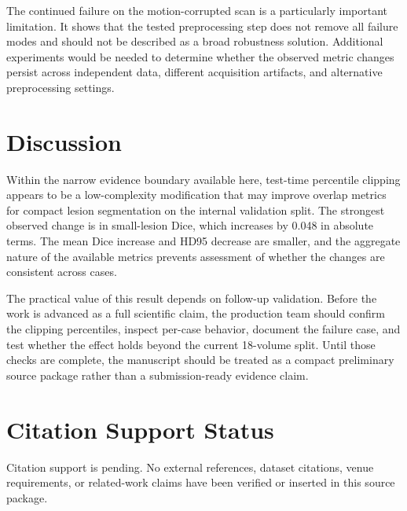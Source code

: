 \documentclass[11pt]{article}
\begin{document}
The continued failure on the motion-corrupted scan is a particularly important limitation. It shows that the tested preprocessing step does not remove all failure modes and should not be described as a broad robustness solution. Additional experiments would be needed to determine whether the observed metric changes persist across independent data, different acquisition artifacts, and alternative preprocessing settings.

\section{Discussion}

Within the narrow evidence boundary available here, test-time percentile clipping appears to be a low-complexity modification that may improve overlap metrics for compact lesion segmentation on the internal validation split. The strongest observed change is in small-lesion Dice, which increases by 0.048 in absolute terms. The mean Dice increase and HD95 decrease are smaller, and the aggregate nature of the available metrics prevents assessment of whether the changes are consistent across cases.

The practical value of this result depends on follow-up validation. Before the work is advanced as a full scientific claim, the production team should confirm the clipping percentiles, inspect per-case behavior, document the failure case, and test whether the effect holds beyond the current 18-volume split. Until those checks are complete, the manuscript should be treated as a compact preliminary source package rather than a submission-ready evidence claim.

\section*{Citation Support Status}

Citation support is pending. No external references, dataset citations, venue requirements, or related-work claims have been verified or inserted in this source package.
\end{document}
